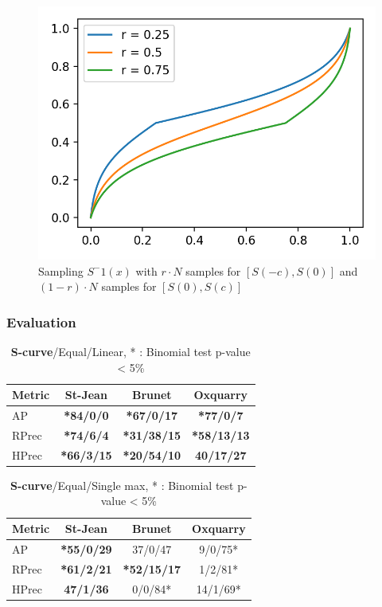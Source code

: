 \begin{figure}
  \includegraphics[width=\linewidth]{img/s_curve_r.png}
  \caption{Sampling $S^-1(x)$ with $r \cdot N$ samples for $\left[S(-c), S(0)\right]$ and $(1-r) \cdot N$ samples for $\left[S(0), S(c)\right]$}
  \label{fig:s_curve_r}
\end{figure}

\subsubsection{Evaluation}

\begin{table}[h]
  \caption{\textbf{S-curve}/Equal/Linear,  * : Binomial test p-value < 5\%}
  \centering
  \label{}
  \begin{tabular}{l c c c}
    \toprule
    Metric & St-Jean & Brunet & Oxquarry \\ \midrule
    AP     & \textbf{*84/0/0} & \textbf{*67/0/17} & \textbf{*77/0/7} \\
    RPrec  & \textbf{*74/6/4} & \textbf{*31/38/15} & \textbf{*58/13/13} \\
    HPrec  & \textbf{*66/3/15} & \textbf{*20/54/10} & \textbf{40/17/27} \\
    \bottomrule
  \end{tabular}
\end{table}

\begin{table}[h]
  \caption{\textbf{S-curve}/Equal/Single max,  * : Binomial test p-value < 5\%}
  \centering
  \label{}
  \begin{tabular}{l c c c}
    \toprule
    Metric & St-Jean  & Brunet & Oxquarry \\ \midrule
    AP     & \textbf{*55/0/29} & 37/0/47 & 9/0/75* \\
    RPrec  & \textbf{*61/2/21} & \textbf{*52/15/17} & 1/2/81* \\
    HPrec  & \textbf{47/1/36} & 0/0/84* & 14/1/69* \\
    \bottomrule
  \end{tabular}
\end{table}

